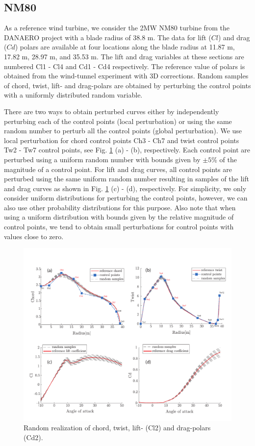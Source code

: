 \documentclass[review]{elsarticle}
\numberwithin{equation}{section}
\numberwithin{equation}{section}
\begin{document}
\subsection{NM80}
As a reference wind turbine, we consider the 2MW NM80 turbine from the DANAERO project \cite{Troldborg2013} with a blade radius of 38.8 m. The data for lift ($Cl$) and drag ($Cd$) polars are available at four locations along the blade radius at 11.87 m, 17.82 m, 28.97 m, and 35.53 m. The lift and drag variables at these sections are numbered Cl1 - Cl4 and Cd1 - Cd4 respectively. The reference value of polars is obtained from the wind-tunnel experiment with 3D corrections. Random samples of chord, twist, lift- and drag-polars are obtained by perturbing the control points with a uniformly distributed random variable.  

There are two ways to obtain perturbed curves either by independently perturbing each of the control points (local perturbation) or using the same random number to perturb all the control points (global perturbation). We use local perturbation for chord control points Ch3 - Ch7 and twist control points Tw2 - Tw7 control points, see Fig. \ref{perturbed_samples} (a) - (b), respectively. Each control point are perturbed using a uniform random number with bounds given by $\pm5\%$ of the magnitude of a control point. For lift and drag curves, all control points are perturbed using the same uniform random number resulting in samples of the lift and drag curves as shown in Fig. \ref{perturbed_samples} (c) - (d), respectively. For simplicity, we only consider uniform distributions for perturbing the control points, however, we can also use other probability distributions for this purpose. Also note that when using a uniform distribution with bounds given by the relative magnitude of control points, we tend to obtain small perturbations for control points with values close to zero. 
\begin{figure}[h!]
\centering
\includegraphics[trim={0.5cm 0cm 0 0cm},clip, scale=0.67]{figure1.pdf}
\caption{Random realization of chord, twist, lift- (Cl2) and drag-polars (Cd2).}
\label{perturbed_samples}
\end{figure}
\end{document}
